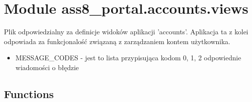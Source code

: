 %
%
%


\section{Module ass8\_portal.accounts.views}

    \label{ass8_portal:accounts:views}
Plik odpowiedzialny za definicje widoków aplikacji 'accounts'. Aplikacja ta
z kolei odpowiada za funkcjonalość związaną z zarządzaniem kontem 
użytkownika.

\begin{itemize}
\setlength{\parskip}{0.6ex}
  \item MESSAGE\_CODES - jest to lista przypisująca kodom 0, 1, 2 odpowiednie 
    wiadomości o błędzie

\end{itemize}



  \subsection{Functions}

    \label{ass8_portal:accounts:views:user_login}

    \vspace{0.5ex}

